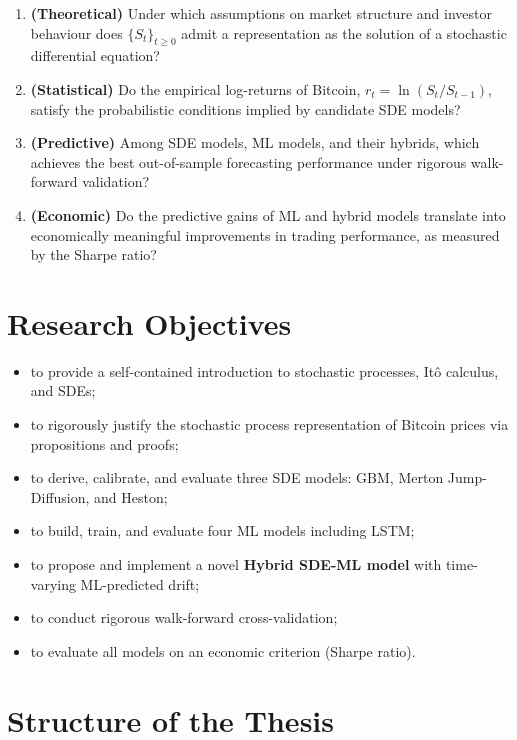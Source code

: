 \documentclass[12pt, a4paper, oneside]{report}
\theoremstyle{plain}
\theoremstyle{definition}
\theoremstyle{remark}
\begin{document}
\begin{enumerate}[leftmargin=1.25cm, label=\arabic*.]
  \item \textbf{(Theoretical)}  Under which assumptions on market structure and
    investor behaviour does $\{S_t\}_{t \geq 0}$ admit a representation as the
    solution of a stochastic differential equation?
  \item \textbf{(Statistical)}  Do the empirical log-returns of Bitcoin,
    $r_t = \ln(S_t / S_{t-1})$, satisfy the probabilistic conditions implied by
    candidate SDE models?
  \item \textbf{(Predictive)}  Among SDE models, ML models, and their hybrids,
    which achieves the best out-of-sample forecasting performance under
    rigorous walk-forward validation?
  \item \textbf{(Economic)}  Do the predictive gains of ML and hybrid models
    translate into economically meaningful improvements in trading performance,
    as measured by the Sharpe ratio?
\end{enumerate}

\section*{Research Objectives}

\begin{itemize}[leftmargin=1.25cm]
  \item to provide a self-contained introduction to stochastic processes,
    It\^{o} calculus, and SDEs;
  \item to rigorously justify the stochastic process representation of Bitcoin
    prices via propositions and proofs;
  \item to derive, calibrate, and evaluate three SDE models: GBM, Merton
    Jump-Diffusion, and Heston;
  \item to build, train, and evaluate four ML models including LSTM;
  \item to propose and implement a novel \textbf{Hybrid SDE-ML model} with
    time-varying ML-predicted drift;
  \item to conduct rigorous walk-forward cross-validation;
  \item to evaluate all models on an economic criterion (Sharpe ratio).
\end{itemize}

\section*{Structure of the Thesis}
\end{document}
